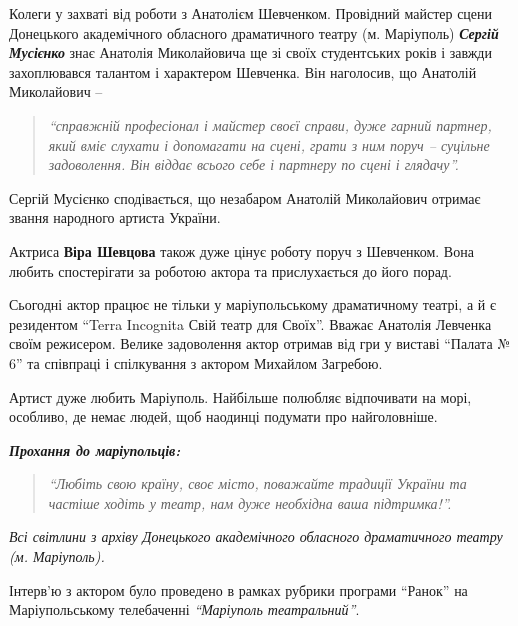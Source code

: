 Колеги у захваті від роботи з Анатолієм Шевченком. Провідний майстер сцени
Донецького академічного обласного драматичного театру (м. Маріуполь) \emph{\textbf{Сергій
Мусієнко}} знає Анатолія Миколайовича ще зі своїх студентських років і завжди
захоплювався талантом і характером Шевченка. Він наголосив, що Анатолій
Миколайович – 
\begin{quote}
\em\enquote{справжній професіонал і майстер своєї справи, дуже гарний
партнер, який вміє слухати і допомагати на сцені, грати з ним поруч – суцільне
задоволення. Він віддає всього себе і партнеру по сцені і глядачу}. 
\end{quote}
Сергій Мусієнко сподівається, що незабаром Анатолій Миколайович отримає звання
народного артиста України.


Актриса \textbf{Віра Шевцова} також дуже цінує роботу поруч з Шевченком. Вона любить
спостерігати за роботою актора та прислухається до його порад.

Сьогодні актор працює не тільки у маріупольському драматичному театрі, а й є
резидентом \enquote{Terra Incognita Свій театр для Своїх}. Вважає Анатолія Левченка
своїм режисером. Велике задоволення актор отримав від гри у виставі \enquote{Палата №
6} та співпраці і спілкування з актором Михайлом Загребою.

Артист дуже любить Маріуполь. Найбільше полюбляє відпочивати на морі, особливо,
де немає людей, щоб наодинці подумати про найголовніше.

\emph{\textbf{Прохання до маріупольців:}} 

\begin{quote}
\em\enquote{Любіть свою країну, своє місто, поважайте традиції
України та частіше ходіть у театр, нам дуже необхідна ваша підтримка!}.
\end{quote}


\emph{Всі світлини з архіву Донецького академічного обласного драматичного театру (м. Маріуполь).}

Інтерв'ю з актором було проведено в рамках рубрики програми \enquote{Ранок} на
Маріупольському телебаченні \emph{\enquote{Маріуполь театральний}}.
